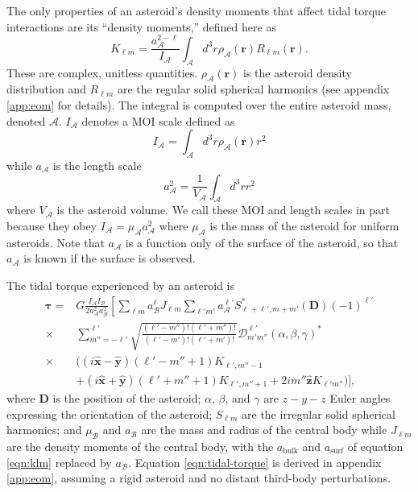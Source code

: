 \documentclass[fleqn,usenatbib]{mnras}
\newcommand{\unit}[1]{\bm{\hat{#1}}}
\begin{document}
The only properties of an asteroid's density moments that affect tidal torque interactions are its ``density moments,'' defined here as
\begin{equation}
  K_{\ell m} = \frac{a_\mathcal{A}^{2-\ell}}{I_\mathcal{A}} \int_\mathcal{A} d^3 r \rho_\mathcal{A}(\bm r) R_{\ell m}(\bm r).
  \label{eqn:klm}
\end{equation}
These are complex, unitless quantities. $\rho_\mathcal{A}(\bm r)$ is the asteroid density distribution and $R_{\ell m}$ are the regular solid spherical harmonics (see appendix \ref{app:eom} for details). The integral is computed over the entire asteroid mass, denoted $\mathcal{A}$. $I_\mathcal{A}$ denotes a MOI scale defined as 
\begin{equation}
  I_\mathcal{A} = \int_\mathcal{A} d^3 r \rho_\mathcal{A}(\bm r) r^2
  \label{eqn:ia}
\end{equation}
while $a_\mathcal{A}$ is the length scale
\begin{equation}
  a_\mathcal{A}^2 = \frac{1}{V_\mathcal{A}} \int_\mathcal{A} d^3 r r^2
  \label{eqn:aa}
\end{equation}
where $V_\mathcal{A}$ is the asteroid volume. We call these MOI and length scales in part because they obey $I_\mathcal{A} = \mu_\mathcal{A} a_\mathcal{A}^2$ where $\mu_\mathcal{A}$ is the mass of the asteroid for uniform asteroids. Note that $a_\mathcal{A}$ is a function only of the surface of the asteroid, so that $a_\mathcal{A}$ is known if the surface is observed.

The tidal torque experienced by an asteroid is 
\begin{equation}
  \begin{split}
  \bm \tau = & G\frac{I_\mathcal{A}I_\mathcal{B}}{2 a_\mathcal{A}^2a_\mathcal{B}^2}\left[\sum_{\ell m} a_\mathcal{B}^\ell J_{\ell m} \sum_{\ell' m'}a_\mathcal{A}^{\ell'}S^*_{\ell+\ell', m + m'} (\bm D) (-1)^{\ell'}\right.\\
  \times & \left.\sum_{m''=-\ell'}^{\ell'} \sqrt{\frac{(\ell'-m'')!(\ell'+m'')!}{(\ell'-m')!(\ell'+m')!}}  \mathcal{D}^{\ell'}_{m'm''}(\alpha, \beta, \gamma)^* \right. \\
  \times & \Big((i\unit x - \unit y)(\ell'-m''+1)K_{\ell',m''-1} \\
  & +(i\unit x+\unit y)(\ell'+m''+1)K_{\ell',m''+1}+2im''\unit z K_{\ell'm''}\Big) \Bigg],
  \end{split}
  \label{eqn:tidal-torque}
\end{equation}
where $\bm D$ is the position of the asteroid; $\alpha$, $\beta$, and $\gamma$ are $z-y-z$ Euler angles expressing the orientation of the asteroid; $S_{\ell m}$ are the irregular solid spherical harmonics; and $\mu_\mathcal{B}$ and $a_\mathcal{B}$ are the mass and radius of the central body while $J_{\ell m}$ are the density moments of the central body, with the $a_\text{bulk}$ and $a_\text{surf}$ of equation \ref{eqn:klm} replaced by $a_\mathcal{B}$. Equation \ref{eqn:tidal-torque} is derived in appendix \ref{app:eom}, assuming a rigid asteroid and no distant third-body perturbations. 
\end{document}
